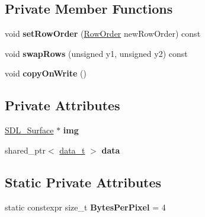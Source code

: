 \subsection*{Private Member Functions}
\begin{DoxyCompactItemize}
\item 
\hypertarget{classImage_a5bd8a41d6e720c5fd5872d3dbba42cbc}{void {\bfseries set\+Row\+Order} (\hyperlink{classImage_a856d0983e089ff127d0bcad3828c1aab}{Row\+Order} new\+Row\+Order) const }\label{classImage_a5bd8a41d6e720c5fd5872d3dbba42cbc}

\item 
\hypertarget{classImage_a16e027ce30976d5d2703dd0c579094be}{void {\bfseries swap\+Rows} (unsigned y1, unsigned y2) const }\label{classImage_a16e027ce30976d5d2703dd0c579094be}

\item 
\hypertarget{classImage_af932925dc96ef5857cf9622803a7be72}{void {\bfseries copy\+On\+Write} ()}\label{classImage_af932925dc96ef5857cf9622803a7be72}

\end{DoxyCompactItemize}
\subsection*{Private Attributes}
\begin{DoxyCompactItemize}
\item 
\hypertarget{classImage_a9592ab5485100bdb7418909f6d0136cd}{\hyperlink{structSDL__Surface}{S\+D\+L\+\_\+\+Surface} $\ast$ {\bfseries img}}\label{classImage_a9592ab5485100bdb7418909f6d0136cd}

\item 
\hypertarget{classImage_a0003e2a1be5b1642913c5b1837c361e7}{shared\+\_\+ptr$<$ \hyperlink{structImage_1_1data__t}{data\+\_\+t} $>$ {\bfseries data}}\label{classImage_a0003e2a1be5b1642913c5b1837c361e7}

\end{DoxyCompactItemize}
\subsection*{Static Private Attributes}
\begin{DoxyCompactItemize}
\item 
\hypertarget{classImage_a34ce493f5ecfbd5cf3dc5d215d0d0620}{static constexpr size\+\_\+t {\bfseries Bytes\+Per\+Pixel} = 4}\label{classImage_a34ce493f5ecfbd5cf3dc5d215d0d0620}

\end{DoxyCompactItemize}
